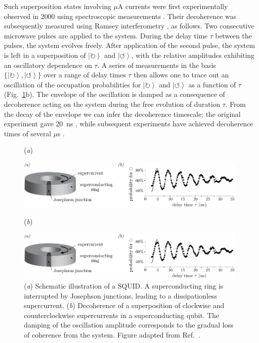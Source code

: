 \documentclass[aps,pra,reprint,amsmath,amssymb,showpacs,nofootinbib,floatfix,onecolumn,12pt]{revtex4-1}
\newcommand{\ket}[1]{\left\vert{#1}\right\rangle}
\begin{document}
Such superposition states involving $\mu$A currents were first experimentally observed in 2000 using spectroscopic measurements \cite{Friedman:2000:rr,Wal:2000:om}. Their decoherence was subsequently measured using Ramsey interferometry \cite{Chiorescu:2003:ta}, as follows. Two consecutive microwave pulses are applied to the system. During the delay time $\tau$ between the pulses, the system evolves freely. After application of the second pulse, the system is left in a superposition of $\ket{\circlearrowright}$ and $\ket{\circlearrowleft}$, with the relative amplitudes exhibiting an oscillatory dependence on $\tau$. A series of measurements in the basis $\{ \ket{\circlearrowright}, \ket{\circlearrowleft} \}$ over a range of delay times $\tau$ then allows one to trace out an oscillation of the occupation probabilities for $\ket{\circlearrowright}$ and $\ket{\circlearrowleft}$ as a function of $\tau$ (Fig.~\ref{fig:squid}b). The envelope of the oscillation is damped as a consequence of decoherence acting on the system during the free evolution of duration $\tau$. From the decay of the envelope we can infer the decoherence timescale; the original experiment gave 20~ns \cite{Chiorescu:2003:ta}, while subsequent experiments have achieved decoherence times of several $\mu$s \cite{Bertet:2005:un}.

\begin{figure}
\raggedright (\emph{a}) 

\begin{center}
\includegraphics[scale=.8]{squid1.pdf}
\end{center}

\raggedright (\emph{b}) 

\begin{center}
\includegraphics[scale=.85]{squid2.pdf}
\end{center}

\caption{\label{fig:squid}(\emph{a}) Schematic illustration of a SQUID. A superconducting ring is interrupted by Josephson junctions, leading to a dissipationless supercurrent. (\emph{b}) Decoherence of a superposition of clockwise and counterclockwise supercurrents in a superconducting qubit. The damping of the oscillation amplitude corresponds to the gradual loss of coherence from the system. Figure adapted from Ref.~\cite{Chiorescu:2003:ta}.}
\end{figure}
\end{document}

